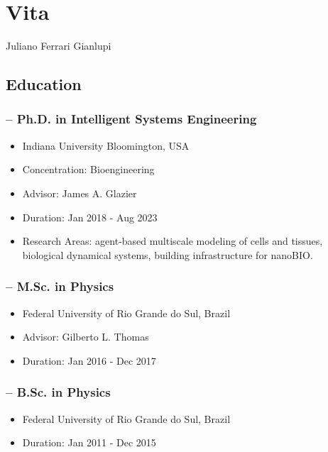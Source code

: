 \chapter*{Vita}
\begin{center}
    Juliano Ferrari Gianlupi
\end{center}


\section*{Education}

\subsection*{-- Ph.D. in Intelligent Systems Engineering}
\begin{itemize}\setlength\itemsep{-.9em}
    \item Indiana University Bloomington, USA 
    \item Concentration: Bioengineering
    \item Advisor: James A. Glazier
    \item Duration: Jan 2018 - Aug 2023
    \item Research Areas: agent-based multiscale modeling of cells and tissues, biological dynamical systems, building infrastructure for nanoBIO.
\end{itemize}

\subsection*{-- M.Sc. in Physics}                     
\begin{itemize}\setlength\itemsep{-.9em}
    \item Federal University of Rio Grande do Sul, Brazil
    \item Advisor: Gilberto L. Thomas
    \item Duration: Jan 2016 - Dec 2017
\end{itemize}

\subsection*{-- B.Sc. in Physics}
\begin{itemize}\setlength\itemsep{-.9em}
    \item Federal University of Rio Grande do Sul, Brazil
    \item Duration: Jan 2011 - Dec 2015
\end{itemize}

